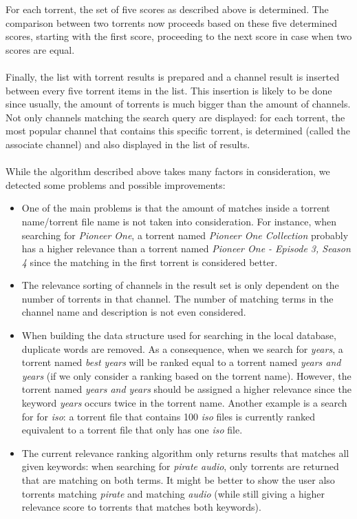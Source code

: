 For each torrent, the set of five scores as described above is determined. The comparison between two torrents now proceeds based on these five determined scores, starting with the first score, proceeding to the next score in case when two scores are equal.\\\\
Finally, the list with torrent results is prepared and a channel result is inserted between every five torrent items in the list. This insertion is likely to be done since usually, the amount of torrents is much bigger than the amount of channels. Not only channels matching the search query are displayed: for each torrent, the most popular channel that contains this specific torrent, is determined (called the associate channel) and also displayed in the list of results.\\\\
While the algorithm described above takes many factors in consideration, we detected some problems and possible improvements:
\begin{itemize}
	\item One of the main problems is that the amount of matches inside a torrent name/torrent file name is not taken into consideration. For instance, when searching for \emph{Pioneer One}, a torrent named \emph{Pioneer One Collection} probably has a higher relevance than a torrent named \emph{Pioneer One - Episode 3, Season 4} since the matching in the first torrent is considered better.
	\item The relevance sorting of channels in the result set is only dependent on the number of torrents in that channel. The number of matching terms in the channel name and description is not even considered.
	\item When building the data structure used for searching in the local database, duplicate words are removed. As a consequence, when we search for \emph{years}, a torrent named \emph{best years} will be ranked equal to a torrent named \emph{years and years} (if we only consider a ranking based on the torrent name). However, the torrent named \emph{years and years} should be assigned a higher relevance since the keyword \emph{years} occurs twice in the torrent name. Another example is a search for for \emph{iso}: a torrent file that contains 100 \emph{iso} files is currently ranked equivalent to a torrent file that only has one \emph{iso} file.
	\item The current relevance ranking algorithm only returns results that matches all given keywords: when searching for \emph{pirate audio}, only torrents are returned that are matching on both terms. It might be better to show the user also torrents matching \emph{pirate} and matching \emph{audio} (while still giving a higher relevance score to torrents that matches both keywords).
\end{itemize}

